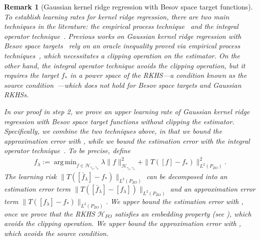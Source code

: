 \documentclass[11pt]{article}
\newcommand{\calH}{\mathcal{H}}
\newcommand{\0}{\mathbf{0}}
\DeclareMathOperator*{\argmin}{arg\,min}
\newtheorem{rem}{Remark}[section]
\begin{document}
\begin{rem}[Gaussian kernel ridge regression with Besov space target functions]
\label{rem:no_clipping}
    To establish learning rates for kernel ridge regression, there are two main techniques in the literature: the empirical process technique~\citep{steinwart2008support,steinwart2009optimal} and the integral operator technique~\citep{fischer2020sobolev,Lin_2020,smale2007learning,caponnetto2007optimal,blanchard2018optimal}. Previous works on Gaussian kernel ridge regression with Besov space targets~\citep{eberts2013optimal, hang2021optimal,hamm2021adaptive}  rely on an oracle inequality proved via empirical process techniques~\citep[Theorem 7.23]{steinwart2008support}, which necessitates a clipping operation on the estimator. 
    On the other hand, the integral operator technique avoids the clipping operation, but it requires the target $f_\ast$ in a power space of the RKHS---a condition known as the source condition~\citep[SRC]{fischer2020sobolev}---which does not hold for Besov space targets and Gaussian RKHSs. 

    In our proof in step 2, we prove an upper learning rate of Gaussian kernel ridge regression with Besov space target functions \emph{without} clipping the estimator.
    Specifically, we combine the two techniques above, in that we bound the approximation error with \citet{hang2021optimal}, while we bound the estimation error with the integral operator technique~\citep{fischer2020sobolev}.
    To be precise, define 
    \begin{align}
    \label{eq:f_lambda_main}
        f_{\lambda} := \argmin_{f\in \calH_{\gamma_x,\gamma_o}}\lambda\|f\|^2_{\calH_{\gamma_x,\gamma_o}} + \|T([f] - f_{\ast})\|^2_{L^2(P_{ZO})}. 
    \end{align}
    The learning risk $ \|T([\bar{f}_{\lambda}] - f_\ast) \|_{L^2(P_{ZO})}$ can be decomposed into an estimation error term $\|T([\bar{f}_{\lambda}] - [f_{\lambda}])\|_{L^2(P_{ZO})}$ and an approximation error term $\|T([f_{\lambda}] - f_{\ast})\|_{L^2(P_{ZO})}$. 
    We upper bound the estimation error with \citet[Theorem 16]{fischer2020sobolev}, once we prove that the RKHS $\calH_{FO}$ satisfies an \emph{embedding property} (see \citet[EMB]{fischer2020sobolev}), which avoids the clipping operation.
    We upper bound the approximation error with \citet[Theorem 4]{hang2021optimal}, which avoids the source condition. 
\end{rem}
\end{document}
